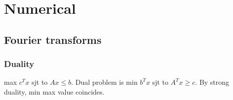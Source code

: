 \chapter{Numerical}
\section{Fourier transforms}
\iffalse
\subsection{General linear recurrences}
  If $a_n = \sum_{k=0}^{n-1} a_k b_{n-k}$, then $A(x) = \frac{a_0}{1-B(x)}$.

\subsection{Inverse polynomial modulo $x^l$}
  Given $A(x)$, find $B(x)$ such that $A(x)B(x) = 1 + x^l Q(x)$ for some $Q(x)$.

  Step 1: Start with $B_0(x) = 1/a_0$

  Step 2: $B_{k+1}(x) = (-B_k(x)^2 A(x) + 2 B_k(x)) \mod x^{2^{k+1}}$.

\subsection{Fast subset convolution}
  Given array $a_i$ of size $2^k$ calculate $b_i = \sum_{j \BitAnd i = i} a_j$.
\fi

\subsection{Duality}
  max $c^Tx$ sjt to $Ax \leq b$. Dual problem is min $b^Tx$ sjt to $A^Tx \geq c$. By strong duality, min max value coincides.

